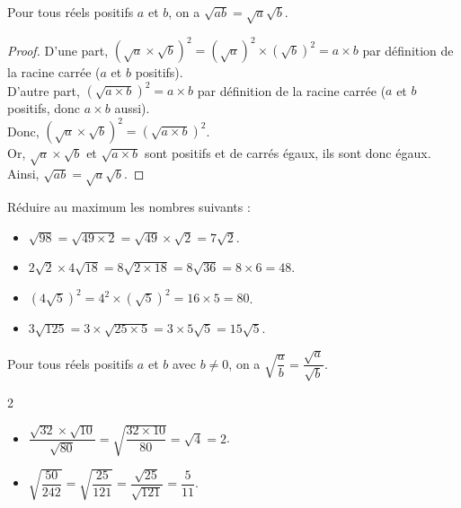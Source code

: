 \vspace{0.4cm}

\begin{Propriété}
Pour tous réels positifs $a$ et $b$, on a $\sqrt{ab}=\sqrt{a}\sqrt{b}$.
\end{Propriété}

\begin{proof}
D'une part, $\left(\sqrt{a}\times \sqrt{b}\right)^2=\left(\sqrt{a}\right)^2\times \left(\sqrt{b}\right)^2=a\times b$ par définition de la racine carrée ($a$ et $b$ positifs).\\
D'autre part, $\left(\sqrt{a\times b}\right)^2=a\times b$ par définition de la racine carrée ($a$ et $b$ positifs, donc $a\times b$ aussi).\\
Donc, $\left(\sqrt{a}\times \sqrt{b}\right)^2=\left(\sqrt{a\times b}\right)^2$. \\
Or, $\sqrt{a}\times \sqrt{b}$ et $\sqrt{a\times b}$ sont positifs et de carrés égaux, ils sont donc égaux.\\ Ainsi, $\sqrt{ab}=\sqrt{a}\sqrt{b}$.

\end{proof}
\vspace{-0,5cm}
\begin{Exemple}
Réduire au maximum les nombres suivants :
\begin{itemize}[label=\textcolor{Couleur8}{$\bullet$}]
\item $\sqrt{98}=\sqrt{49\times 2}=\sqrt{49}\times \sqrt{2}=7\sqrt{2}$.
\item $2\sqrt{2}\times 4\sqrt{18}=8\sqrt{2\times 18}=8\sqrt{36}=8\times 6=48$.
\item $\left(4\sqrt{5}\right)^2=4^2\times\left(\sqrt{5}\right)^2=16\times 5=80$.
\item $3\sqrt{125}=3\times \sqrt{25\times 5}=3\times 5\sqrt{5}=15\sqrt{5}$.
\end{itemize}

\end{Exemple}


\begin{Propriété}
Pour tous réels positifs $a$ et $b$ avec $b\neq 0$, on a $\sqrt{\dfrac{a}{b}}=\dfrac{\sqrt{a}}{\sqrt{b}}$.
\end{Propriété}



\begin{Exemple}
\leavevmode\vspace{-\baselineskip}
\begin{multicols}{2}
\begin{itemize}[label=\textcolor{Couleur8}{$\bullet$}]
\item $\dfrac{\sqrt{32}\times\sqrt{10}}{\sqrt{80}}=\sqrt{\dfrac{32\times 10}{80}}=\sqrt{4}=2$.
\item $\sqrt{\dfrac{50}{242}}=\sqrt{\dfrac{25}{121}}=\dfrac{\sqrt{25}}{\sqrt{121}}=\dfrac{5}{11}$.
\end{itemize}
\end{multicols}
\end{Exemple}

